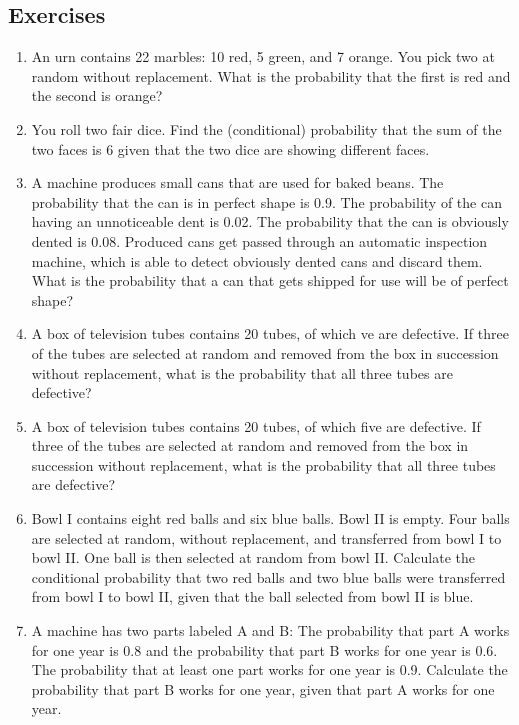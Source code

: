 \documentclass[../main.tex]{subfiles}
\begin{document}
{\fontsize{10}{10}\selectfont
\subsection{Exercises}
\begin{enumerate}
	
	\item An urn contains 22 marbles: 10 red, 5 green, and 7 orange. You pick two at
	random without replacement. What is the probability that the first is red
	and the second is orange?
	
	\item You roll two fair dice. Find the (conditional) probability that the sum of the
	two faces is 6 given that the two dice are showing different faces.
	
	\item A machine produces small cans that are used for baked beans. The probability
	 that the can is in perfect shape is 0.9. The probability of the can having
	an unnoticeable dent is 0.02. The probability that the can is obviously dented
	is 0.08. Produced cans get passed through an automatic inspection machine,
	which is able to detect obviously dented cans and discard them. What is the
	probability that a can that gets shipped for use will be of perfect shape?
	
	\item A box of television tubes contains 20 tubes, of which ve are defective. If
	three of the tubes are selected at random and removed from the box in
	succession without replacement, what is the probability that all three tubes
	are defective?
	
	\item A box of television tubes contains 20 tubes, of which five are defective. If
	three of the tubes are selected at random and removed from the box in
	succession without replacement, what is the probability that all three tubes
	are defective?
	
	\item Bowl I contains eight red balls and six blue balls. Bowl II is empty. Four
	balls are selected at random, without replacement, and transferred from bowl
	I to bowl II. One ball is then selected at random from bowl II.
	Calculate the conditional probability that two red balls and two blue balls
	were transferred from bowl I to bowl II, given that the ball selected from
	bowl II is blue.
	
	\item A machine has two parts labeled A and B: The probability that part A works
	for one year is 0.8 and the probability that part B works for one year is 0.6.
	The probability that at least one part works for one year is 0.9.
	Calculate the probability that part B works for one year, given that part A
	works for one year.
	

\end{enumerate}}
\end{document}
